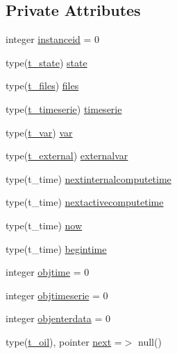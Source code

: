 \subsection*{Private Attributes}
\begin{DoxyCompactItemize}
\item 
integer \mbox{\hyperlink{structmoduleoil__0d_1_1t__oil_a24cc61c4b4ddb980a8fbd5444696e582}{instanceid}} = 0
\item 
type(\mbox{\hyperlink{structmoduleoil__0d_1_1t__state}{t\+\_\+state}}) \mbox{\hyperlink{structmoduleoil__0d_1_1t__oil_af91eaaa62a72e9a094a04e15e435af49}{state}}
\item 
type(\mbox{\hyperlink{structmoduleoil__0d_1_1t__files}{t\+\_\+files}}) \mbox{\hyperlink{structmoduleoil__0d_1_1t__oil_a4349be29a573616c507db69503cdc1f3}{files}}
\item 
type(\mbox{\hyperlink{structmoduleoil__0d_1_1t__timeserie}{t\+\_\+timeserie}}) \mbox{\hyperlink{structmoduleoil__0d_1_1t__oil_a0625082f541557ea1ad6eb423931ec69}{timeserie}}
\item 
type(\mbox{\hyperlink{structmoduleoil__0d_1_1t__var}{t\+\_\+var}}) \mbox{\hyperlink{structmoduleoil__0d_1_1t__oil_afd42ce6d8660ed76cad7568cc2624951}{var}}
\item 
type(\mbox{\hyperlink{structmoduleoil__0d_1_1t__external}{t\+\_\+external}}) \mbox{\hyperlink{structmoduleoil__0d_1_1t__oil_ab5d75cea958859fc15c48084d0c90b47}{externalvar}}
\item 
type(t\+\_\+time) \mbox{\hyperlink{structmoduleoil__0d_1_1t__oil_a238fcb4a9fce680d8ebe38d797754a91}{nextinternalcomputetime}}
\item 
type(t\+\_\+time) \mbox{\hyperlink{structmoduleoil__0d_1_1t__oil_a99b6cdc45ab4661c533d96b646f035c4}{nextactivecomputetime}}
\item 
type(t\+\_\+time) \mbox{\hyperlink{structmoduleoil__0d_1_1t__oil_a25aab0c891a70ac8f14da40e3dbeb63e}{now}}
\item 
type(t\+\_\+time) \mbox{\hyperlink{structmoduleoil__0d_1_1t__oil_ae4bb13fa87da889c4c32e48eafa8b8b6}{begintime}}
\item 
integer \mbox{\hyperlink{structmoduleoil__0d_1_1t__oil_a6a5089afe8553125a768377c51cfd28b}{objtime}} = 0
\item 
integer \mbox{\hyperlink{structmoduleoil__0d_1_1t__oil_abaef4be6a4c744b209712e0a279c8889}{objtimeserie}} = 0
\item 
integer \mbox{\hyperlink{structmoduleoil__0d_1_1t__oil_aef2f916ebe58607491e84b6d91107f4a}{objenterdata}} = 0
\item 
type(\mbox{\hyperlink{structmoduleoil__0d_1_1t__oil}{t\+\_\+oil}}), pointer \mbox{\hyperlink{structmoduleoil__0d_1_1t__oil_a9a15fc7341bb76a606a68506b356b781}{next}} =$>$ null()
\end{DoxyCompactItemize}


